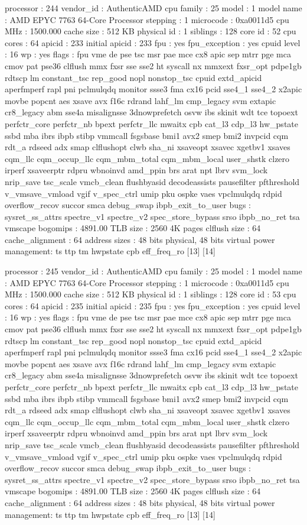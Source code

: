 processor	: 244
vendor_id	: AuthenticAMD
cpu family	: 25
model		: 1
model name	: AMD EPYC 7763 64-Core Processor
stepping	: 1
microcode	: 0xa0011d5
cpu MHz		: 1500.000
cache size	: 512 KB
physical id	: 1
siblings	: 128
core id		: 52
cpu cores	: 64
apicid		: 233
initial apicid	: 233
fpu		: yes
fpu_exception	: yes
cpuid level	: 16
wp		: yes
flags		: fpu vme de pse tsc msr pae mce cx8 apic sep mtrr pge mca cmov pat pse36 clflush mmx fxsr sse sse2 ht syscall nx mmxext fxsr_opt pdpe1gb rdtscp lm constant_tsc rep_good nopl nonstop_tsc cpuid extd_apicid aperfmperf rapl pni pclmulqdq monitor ssse3 fma cx16 pcid sse4_1 sse4_2 x2apic movbe popcnt aes xsave avx f16c rdrand lahf_lm cmp_legacy svm extapic cr8_legacy abm sse4a misalignsse 3dnowprefetch osvw ibs skinit wdt tce topoext perfctr_core perfctr_nb bpext perfctr_llc mwaitx cpb cat_l3 cdp_l3 hw_pstate ssbd mba ibrs ibpb stibp vmmcall fsgsbase bmi1 avx2 smep bmi2 invpcid cqm rdt_a rdseed adx smap clflushopt clwb sha_ni xsaveopt xsavec xgetbv1 xsaves cqm_llc cqm_occup_llc cqm_mbm_total cqm_mbm_local user_shstk clzero irperf xsaveerptr rdpru wbnoinvd amd_ppin brs arat npt lbrv svm_lock nrip_save tsc_scale vmcb_clean flushbyasid decodeassists pausefilter pfthreshold v_vmsave_vmload vgif v_spec_ctrl umip pku ospke vaes vpclmulqdq rdpid overflow_recov succor smca debug_swap ibpb_exit_to_user
bugs		: sysret_ss_attrs spectre_v1 spectre_v2 spec_store_bypass srso ibpb_no_ret tsa vmscape
bogomips	: 4891.00
TLB size	: 2560 4K pages
clflush size	: 64
cache_alignment	: 64
address sizes	: 48 bits physical, 48 bits virtual
power management: ts ttp tm hwpstate cpb eff_freq_ro [13] [14]

processor	: 245
vendor_id	: AuthenticAMD
cpu family	: 25
model		: 1
model name	: AMD EPYC 7763 64-Core Processor
stepping	: 1
microcode	: 0xa0011d5
cpu MHz		: 1500.000
cache size	: 512 KB
physical id	: 1
siblings	: 128
core id		: 53
cpu cores	: 64
apicid		: 235
initial apicid	: 235
fpu		: yes
fpu_exception	: yes
cpuid level	: 16
wp		: yes
flags		: fpu vme de pse tsc msr pae mce cx8 apic sep mtrr pge mca cmov pat pse36 clflush mmx fxsr sse sse2 ht syscall nx mmxext fxsr_opt pdpe1gb rdtscp lm constant_tsc rep_good nopl nonstop_tsc cpuid extd_apicid aperfmperf rapl pni pclmulqdq monitor ssse3 fma cx16 pcid sse4_1 sse4_2 x2apic movbe popcnt aes xsave avx f16c rdrand lahf_lm cmp_legacy svm extapic cr8_legacy abm sse4a misalignsse 3dnowprefetch osvw ibs skinit wdt tce topoext perfctr_core perfctr_nb bpext perfctr_llc mwaitx cpb cat_l3 cdp_l3 hw_pstate ssbd mba ibrs ibpb stibp vmmcall fsgsbase bmi1 avx2 smep bmi2 invpcid cqm rdt_a rdseed adx smap clflushopt clwb sha_ni xsaveopt xsavec xgetbv1 xsaves cqm_llc cqm_occup_llc cqm_mbm_total cqm_mbm_local user_shstk clzero irperf xsaveerptr rdpru wbnoinvd amd_ppin brs arat npt lbrv svm_lock nrip_save tsc_scale vmcb_clean flushbyasid decodeassists pausefilter pfthreshold v_vmsave_vmload vgif v_spec_ctrl umip pku ospke vaes vpclmulqdq rdpid overflow_recov succor smca debug_swap ibpb_exit_to_user
bugs		: sysret_ss_attrs spectre_v1 spectre_v2 spec_store_bypass srso ibpb_no_ret tsa vmscape
bogomips	: 4891.00
TLB size	: 2560 4K pages
clflush size	: 64
cache_alignment	: 64
address sizes	: 48 bits physical, 48 bits virtual
power management: ts ttp tm hwpstate cpb eff_freq_ro [13] [14]

